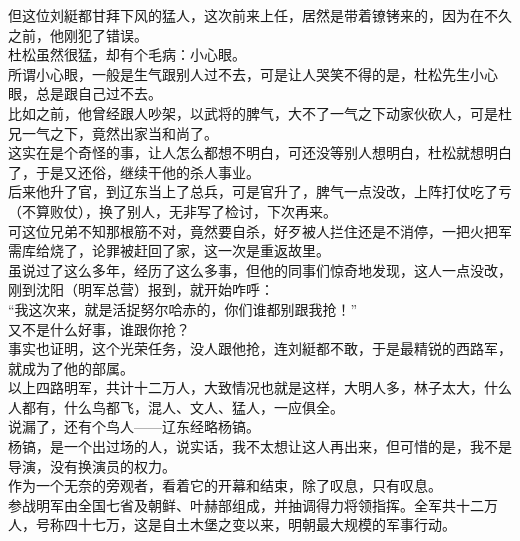 \begin{multicols}{\theparacolNo}
但这位刘綎都甘拜下风的猛人，这次前来上任，居然是带着镣铐来的，因为在不久之前，他刚犯了错误。\\

杜松虽然很猛，却有个毛病：小心眼。\\

所谓小心眼，一般是生气跟别人过不去，可是让人哭笑不得的是，杜松先生小心眼，总是跟自己过不去。\\

比如之前，他曾经跟人吵架，以武将的脾气，大不了一气之下动家伙砍人，可是杜兄一气之下，竟然出家当和尚了。\\

这实在是个奇怪的事，让人怎么都想不明白，可还没等别人想明白，杜松就想明白了，于是又还俗，继续干他的杀人事业。\\

后来他升了官，到辽东当上了总兵，可是官升了，脾气一点没改，上阵打仗吃了亏（不算败仗），换了别人，无非写了检讨，下次再来。\\

可这位兄弟不知那根筋不对，竟然要自杀，好歹被人拦住还是不消停，一把火把军需库给烧了，论罪被赶回了家，这一次是重返故里。\\

虽说过了这么多年，经历了这么多事，但他的同事们惊奇地发现，这人一点没改，刚到沈阳（明军总营）报到，就开始咋呼：\\

“我这次来，就是活捉努尔哈赤的，你们谁都别跟我抢！”\\

又不是什么好事，谁跟你抢？\\

事实也证明，这个光荣任务，没人跟他抢，连刘綎都不敢，于是最精锐的西路军，就成为了他的部属。\\

以上四路明军，共计十二万人，大致情况也就是这样，大明人多，林子太大，什么人都有，什么鸟都飞，混人、文人、猛人，一应俱全。\\

说漏了，还有个鸟人——辽东经略杨镐。\\

杨镐，是一个出过场的人，说实话，我不太想让这人再出来，但可惜的是，我不是导演，没有换演员的权力。\\

作为一个无奈的旁观者，看着它的开幕和结束，除了叹息，只有叹息。\\

参战明军由全国七省及朝鲜、叶赫部组成，并抽调得力将领指挥。全军共十二万人，号称四十七万，这是自土木堡之变以来，明朝最大规模的军事行动。\\


\end{multicols}
